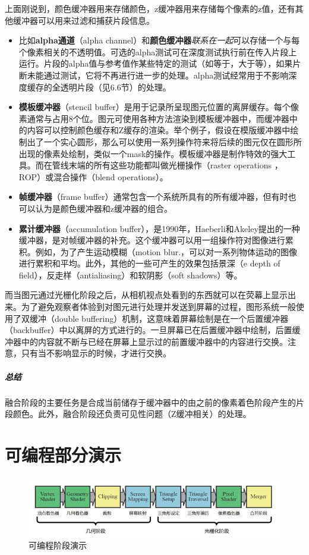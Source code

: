 \documentclass[UTF8,a4paper,12pt]{ctexbook}
\begin{document}
				上面刚说到，颜色缓冲器用来存储颜色，z缓冲器用来存储每个像素的z值，还有其他缓冲器可以用来过滤和捕获片段信息。
				
				\begin{itemize}	
					\item 比如\textbf{alpha通道}（alpha channel）和\textbf{颜色缓冲器}\textit{联系在一起}可以存储一个与每个像素相关的不透明值。可选的alpha测试可在深度测试执行前在传入片段上运行。片段的alpha值与参考值作某些特定的测试（如等于，大于等），如果片断未能通过测试，它将不再进行进一步的处理。alpha测试经常用于不影响深度缓存的全透明片段（见6.6节）的处理。
									
					\item \textbf{模板缓冲器}（stencil buffer）是用于记录所呈现图元位置的离屏缓存。每个像素通常与占用8个位。图元可使用各种方法渲染到模板缓冲器中，而缓冲器中的内容可以控制颜色缓存和Z缓存的渲染。举个例子，假设在模版缓冲器中绘制出了一个实心圆形，那么可以使用一系列操作符来将后续的图元仅在圆形所出现的像素处绘制，类似一个mask的操作。模板缓冲器是制作特效的强大工具。而在管线末端的所有这些功能都叫做光栅操作（raster operations ，ROP）或混合操作（blend operations）。
									
					\item \textbf{帧缓冲器}（frame buffer）通常包含一个系统所具有的所有缓冲器，但有时也可以认为是颜色缓冲器和z缓冲器的组合。
									
					\item \textbf{累计缓冲器}（accumulation buffer），是1990年，Haeberli和Akeley提出的一种缓冲器，是对帧缓冲器的补充。这个缓冲器可以用一组操作符对图像进行累积。例如，为了产生运动模糊（motion blur.，可以对一系列物体运动的图像进行累积和平均。此外，其他的一些可产生的效果包括景深（e depth of field），反走样（antialiasing）和软阴影（soft shadows）等。
				\end{itemize}

				而当图元通过光栅化阶段之后，从相机视点处看到的东西就可以在荧幕上显示出来。为了避免观察者体验到对图元进行处理并发送到屏幕的过程，图形系统一般使用了双缓冲（double buffering）机制，这意味着屏幕绘制是在一个后置缓冲器（backbuffer）中以离屏的方式进行的。一旦屏幕已在后置缓冲器中绘制，后置缓冲器中的内容就不断与已经在屏幕上显示过的前置缓冲器中的内容进行交换。注意，只有当不影响显示的时候，才进行交换。
				
				\subparagraph{总结}融合阶段的主要任务是合成当前储存于缓冲器中的由之前的像素着色阶段产生的片段颜色。此外，融合阶段还负责可见性问题（Z缓冲相关）的处理。

	\section{可编程部分演示}
		\begin{figure}[H]
			\centering
			\includegraphics[scale=0.57]{ProgramAble}
			\caption{可编程阶段演示}
		\end{figure}	
		
\end{document}
